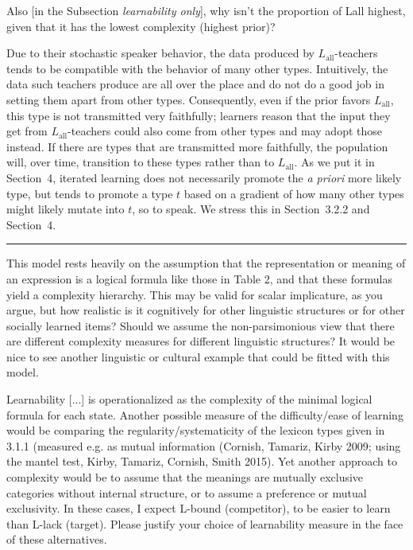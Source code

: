 \documentclass[12pt,a4paper]{article}
\begin{document}
\vspace{.5cm}
\begin{mdframed}[backgroundcolor=gray!25,linecolor=gray!25]
Also [in the Subsection {\em learnability only}], why isn't the proportion of Lall highest, given that it has the lowest complexity (highest prior)?
\end{mdframed}
%
Due to their stochastic speaker behavior, the data produced by $L_{\text{all}}$-teachers tends to be compatible with the behavior of many other types. Intuitively, the data such teachers produce are all over the place and do not do a good job in setting them apart from other types. Consequently, even if the prior favors $L_{\text{all}}$, this type is not transmitted very faithfully; learners reason that the input they get from $L_{\text{all}}$-teachers could also come from other types and may adopt those instead. If there are types that are transmitted more faithfully, the population will, over time, transition to these types rather than to $L_{\text{all}}$. As we put it in Section~4, iterated learning does not necessarily promote the {\em a priori} more likely type, but tends to promote a type $t$ based on a gradient of how many other types might likely mutate into $t$, so to speak. We stress this in Section~3.2.2 and Section~4.

\vspace{1cm}
\noindent\rule{\textwidth}{1pt}

\begin{mdframed}[backgroundcolor=gray!25,linecolor=gray!25,frametitle= Reviewer \thereviewerCounter~comment \thereviewerCommentCounter \hfill ~~({\it LOT \& model relation})]
%
This model rests heavily on the assumption that the representation or meaning of an expression is a logical formula like those in Table 2, and that these formulas yield a complexity hierarchy.  This may be valid for scalar implicature, as you argue, but how realistic is it cognitively for other linguistic structures or for other socially learned items? Should we assume the non-parsimonious view that there are different complexity measures for different linguistic structures? It would be nice to see another linguistic or cultural example that could be fitted with this model.
%
\end{mdframed}

\begin{mdframed}[backgroundcolor=gray!25,linecolor=gray!25]
Learnability [...] is operationalized as the complexity of the minimal logical formula for each state. Another possible measure of the difficulty/ease of learning would be comparing the regularity/systematicity of the lexicon types given in 3.1.1 (measured e.g. as mutual information (Cornish, Tamariz, Kirby 2009; using the mantel test, Kirby, Tamariz, Cornish, Smith 2015). Yet another approach to complexity would be to assume that the meanings are mutually exclusive categories without internal structure, or to assume a preference or mutual exclusivity. In these cases, I expect L-bound (competitor), to be easier to learn than L-lack (target). Please justify your choice of learnability measure in the face of these alternatives.
\end{mdframed}
\end{document}
